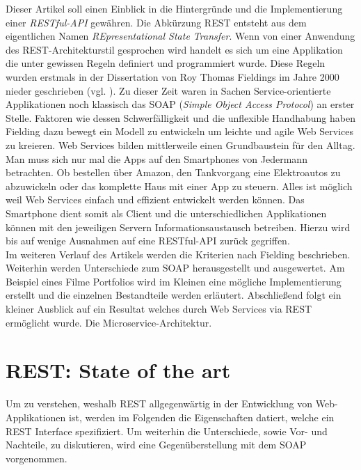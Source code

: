 \documentclass[fleqn,10.5pt,ngerman]{SelfArx}
\newlength{\tocsep}
\begin{document}
Dieser Artikel soll einen Einblick in die Hintergründe und die Implementierung einer \textit{RESTful-API} gewähren. Die Abkürzung REST entsteht aus dem eigentlichen Namen \textit{REpresentational State Transfer}. Wenn von einer Anwendung des REST-Architekturstil gesprochen wird handelt es sich um eine Applikation die unter gewissen Regeln definiert und programmiert wurde. Diese Regeln wurden erstmals in der Dissertation von Roy Thomas Fieldings im Jahre 2000 nieder geschrieben (vgl. \cite{Fielding:2000}). Zu dieser Zeit waren in Sachen Service-orientierte Applikationen noch klassisch das SOAP (\textit{Simple Object Access Protocol}) an erster Stelle. Faktoren wie dessen Schwerfälligkeit und die unflexible Handhabung haben Fielding dazu bewegt ein Modell zu entwickeln um leichte und agile Web Services zu kreieren. Web Services bilden mittlerweile einen Grundbaustein für den Alltag. Man muss sich nur mal die Apps auf den Smartphones von Jedermann betrachten. Ob bestellen über Amazon, den Tankvorgang eine Elektroautos zu abzuwickeln oder das komplette Haus mit einer App zu steuern. Alles ist möglich weil Web Services einfach und effizient entwickelt werden können. Das Smartphone dient somit als Client und die unterschiedlichen Applikationen können mit den jeweiligen Servern Informationsaustausch betreiben. Hierzu wird bis auf wenige Ausnahmen auf eine RESTful-API zurück gegriffen. \\ Im weiteren Verlauf des Artikels werden die Kriterien nach Fielding beschrieben. Weiterhin werden Unterschiede zum SOAP herausgestellt und ausgewertet. Am Beispiel eines Filme Portfolios wird im Kleinen eine mögliche Implementierung erstellt und die einzelnen Bestandteile werden erläutert. Abschließend folgt ein kleiner Ausblick auf ein Resultat welches durch Web Services via REST ermöglicht wurde. Die Microservice-Architektur.


\section{REST: State of the art}
Um zu verstehen, weshalb REST allgegenwärtig in der Entwicklung von Web-Applikationen ist, werden im Folgenden die Eigenschaften datiert, welche ein REST Interface spezifiziert. Um weiterhin die Unterschiede, sowie Vor- und Nachteile, zu diskutieren, wird eine Gegenüberstellung mit dem SOAP vorgenommen. 
\end{document}
